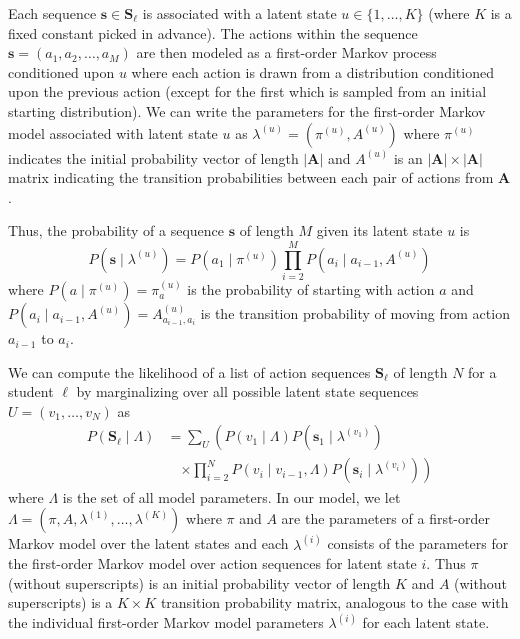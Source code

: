 Each sequence $\mathbf{s} \in \mathbf{S}_\ell$ is associated with a latent
state $u \in \{1,\ldots,K\}$ (where $K$ is a fixed constant picked in
advance). The actions within the sequence $\mathbf{s} = (a_1, a_2, \ldots,
a_M)$ are then modeled as a first-order Markov process conditioned upon $u$
where each action is drawn from a distribution conditioned upon the
previous action (except for the first which is sampled from an initial
starting distribution). We can write the parameters for the first-order
Markov model associated with latent state $u$ as $\lambda^{(u)} =
(\pi^{(u)}, A^{(u)})$ where $\pi^{(u)}$ indicates the initial probability
vector of length $|\mathbf{A}|$ and $A^{(u)}$ is an $|\mathbf{A}| \times
|\mathbf{A}|$ matrix indicating the transition probabilities between each
pair of actions from $\mathbf{A}$.

Thus, the probability of a sequence $\mathbf{s}$ of length $M$ given its
latent state $u$ is
\begin{equation}
  P(\mathbf{s} \mid \lambda^{(u)}) = P(a_1 \mid \pi^{(u)}) \prod_{i=2}^M P(a_i \mid
  a_{i-1}, A^{(u)})
\end{equation}
where $P(a \mid \pi^{(u)}) = \pi^{(u)}_a$ is the probability of starting
with action $a$ and $P(a_i \mid a_{i-1}, A^{(u)}) = A^{(u)}_{a_{i-1}, a_i}$
is the transition probability of moving from action $a_{i-1}$ to $a_{i}$.

We can compute the likelihood of a list of action sequences
$\mathbf{S}_\ell$ of length $N$ for a student $\ell$ by marginalizing over
all possible latent state sequences $U=(v_1, \ldots, v_N)$ as
\begin{equation}
  \begin{split}
  P(\mathbf{S}_\ell \mid \Lambda)
  &= \sum_U \left(P(v_1 \mid \Lambda) P(\mathbf{s}_1 \mid \lambda^{(v_1)})
  \phantom{\prod_{i=2}^N}\right.\\
  &\quad \left.\times \prod_{i=2}^N P(v_i \mid v_{i-1}, \Lambda)
  P(\mathbf{s}_i \mid \lambda^{(v_i)})\right)
  \end{split}
\end{equation}
where $\Lambda$ is the set of all model parameters.  In our model, we let
$\Lambda = (\pi, A, \lambda^{(1)}, \ldots, \lambda^{(K)})$ where $\pi$ and
$A$ are the parameters of a first-order Markov model over the latent states
and each $\lambda^{(i)}$ consists of the parameters for the first-order
Markov model over action sequences for latent state $i$. Thus $\pi$
(without superscripts) is an initial probability vector of length $K$ and
$A$ (without superscripts) is a $K \times K$ transition probability matrix,
analogous to the case with the individual first-order Markov model
parameters $\lambda^{(i)}$ for each latent state.

